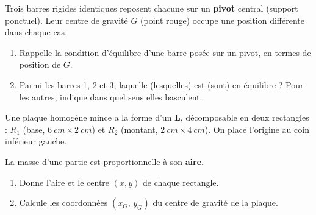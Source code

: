 \documentclass[11pt,a4paper]{article}
\begin{document}
\begin{exo}
Trois barres rigides identiques reposent chacune sur un \textbf{pivot} central (support ponctuel). Leur
centre de gravité $G$ (point rouge) occupe une position différente dans chaque cas.
\begin{center}
\end{center}
\begin{enumerate}[label=\alph*)]
  \item Rappelle la condition d'équilibre d'une barre posée sur un pivot, en termes de position de $G$.
  \item Parmi les barres 1, 2 et 3, laquelle (lesquelles) est (sont) en équilibre ? Pour les autres,
        indique dans quel sens elles basculent.
\end{enumerate}
\end{exo}

\begin{exo}
Une plaque homogène mince a la forme d'un \textbf{L}, décomposable en deux rectangles : $R_1$
(base, $\qty{6}{cm}\times\qty{2}{cm}$) et $R_2$ (montant, $\qty{2}{cm}\times\qty{4}{cm}$). On place
l'origine au coin inférieur gauche.
\begin{center}
\end{center}
La masse d'une partie est proportionnelle à son \textbf{aire}.
\begin{enumerate}[label=\alph*)]
  \item Donne l'aire et le centre $(x,y)$ de chaque rectangle.
  \item Calcule les coordonnées $(x_G,\,y_G)$ du centre de gravité de la plaque.
\end{enumerate}
\end{exo}
\end{document}
